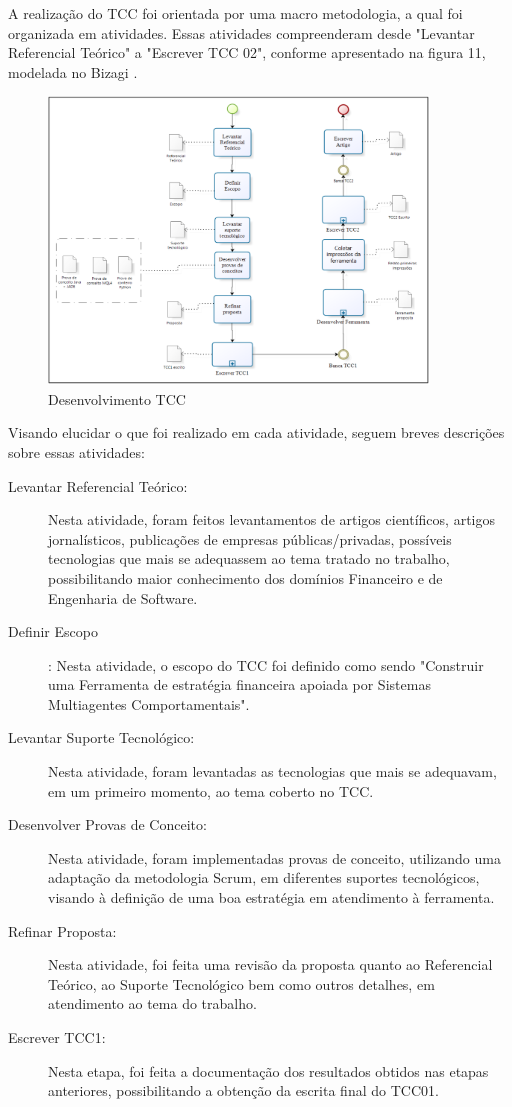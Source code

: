 A realização do TCC foi orientada por uma macro metodologia, a qual foi organizada em atividades.
Essas atividades compreenderam desde "Levantar Referencial Teórico" a "Escrever TCC 02", conforme apresentado na figura 11, modelada no Bizagi \textcopyright.
\begin{figure}[h]
\centering
\label{f11}
\includegraphics[width=0.9\textwidth]{figuras/f27}
\caption{Desenvolvimento TCC}
\end{figure}
Visando elucidar o que foi realizado em cada atividade, seguem breves descrições sobre essas atividades:

\begin{description}
\item [Levantar Referencial Teórico:] Nesta atividade, foram feitos levantamentos de artigos científicos, artigos jornalísticos, publicações de empresas públicas/privadas, possíveis tecnologias que mais se adequassem ao tema tratado no trabalho, possibilitando maior conhecimento dos domínios Financeiro e de Engenharia de Software.

\item [Definir Escopo]:
Nesta atividade, o escopo do TCC foi definido como sendo "Construir uma Ferramenta de estratégia financeira apoiada por Sistemas Multiagentes Comportamentais".

\item [Levantar Suporte Tecnológico:] 
 Nesta atividade, foram levantadas as tecnologias que mais se adequavam, em um primeiro momento, ao tema coberto no TCC.

\item [Desenvolver Provas de Conceito:]
Nesta atividade, foram implementadas provas de conceito, utilizando uma adaptação da metodologia Scrum, em diferentes suportes tecnológicos, visando à definição de uma boa estratégia em atendimento à ferramenta.

\item [Refinar Proposta:] 
Nesta atividade, foi feita uma revisão da proposta quanto ao Referencial Teórico, ao Suporte Tecnológico bem como outros detalhes, em atendimento ao tema do trabalho.

\item [Escrever TCC1:]
Nesta etapa, foi feita a documentação dos resultados obtidos nas etapas anteriores, possibilitando a obtenção da escrita final do TCC01.
\end{description}

